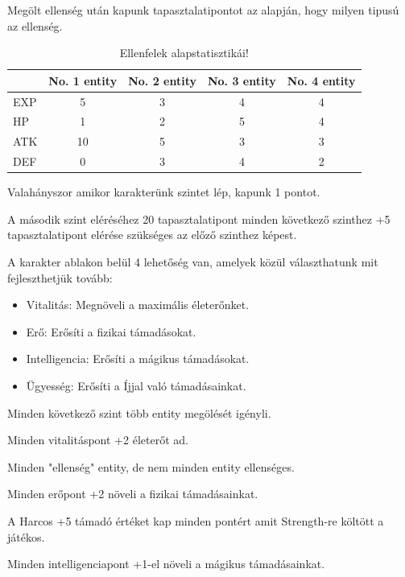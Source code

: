 Megölt ellenség után kapunk tapasztalatipontot az alapján, hogy milyen tipusú az ellenség.


\begin{table}[h]
\centering
\caption{Ellenfelek alapstatisztikái!}
\label{tab:minta}
\begin{tabular}{|l|c|c|c|c|}
\hline
 & No. 1 entity & No. 2 entity & No. 3 entity & No. 4 entity  \\
\hline
EXP & 5 & 3 & 4 & 4 \\
\hline
HP & 1 & 2 & 5 & 4 \\
\hline
ATK & 10 & 5 & 3 & 3 \\
\hline
DEF & 0 & 3 & 4 & 2 \\
\hline
\end{tabular}
\end{table}

Valahányszor amikor karakterünk szintet lép, kapunk 1 pontot.

A második szint eléréséhez 20 tapasztalatipont minden következő szinthez +5 tapasztalatipont elérése szükséges az előző szinthez képest.

A karakter ablakon belül 4 lehetőség van, amelyek közül választhatunk mit fejleszthetjük tovább:
\begin{itemize}
    \item Vitalitás: Megnöveli a maximális életerőnket.
    \item Erő: Erősíti a fizikai támadásokat.
    \item Intelligencia: Erősíti a mágikus támadásokat.
    \item Ügyesség: Erősíti a Íjjal való támadásainkat.
\end{itemize}

\noindent Minden következő szint több entity megölését igényli.

\noindent Minden vitalitáspont +2 életerőt ad.

\noindent Minden "ellenség" entity, de nem minden entity ellenséges.


\noindent Minden erőpont +2 növeli a fizikai támadásainkat.

\noindent A Harcos +5 támadó értéket kap minden pontért amit Strength-re költött a játékos.

\noindent Minden intelligenciapont +1-el növeli a mágikus támadásainkat.

